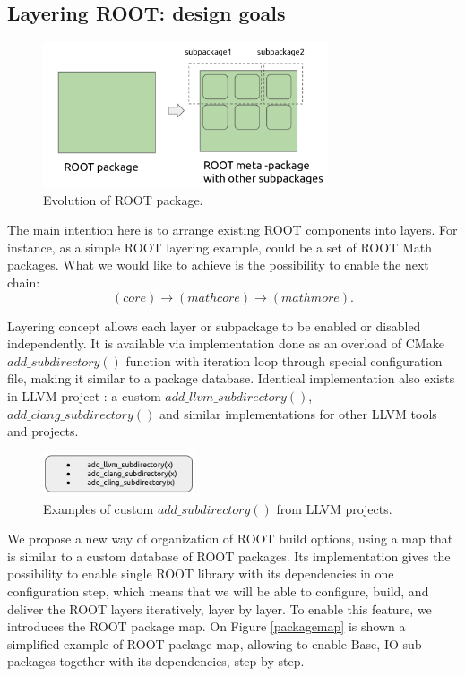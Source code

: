 \documentclass[12pt]{iopart}
\begin{document}
\subsection{Layering ROOT: design goals}

\begin{figure}[!h]
\centering
\includegraphics[width=0.75\textwidth]{root-pm-subpackage.png}
\caption{Evolution of ROOT package.}
\label{subpackage}
\end{figure}

The main intention here is to arrange existing ROOT components into layers. For instance, as a simple ROOT layering example, could be a set of ROOT Math packages. What we would like to achieve is the possibility to enable the next chain:
\begin{equation}
  (core) \rightarrow (mathcore)  \rightarrow (mathmore).  
\end{equation}

Layering concept allows each layer or subpackage to be enabled or disabled independently. It is available via implementation done as an overload of CMake $add\_subdirectory()$ function with iteration loop through special configuration file, making it similar to a package database. Identical implementation also exists in LLVM project \cite{llvm}: a custom $add\_llvm\_subdirectory()$, $add\_clang\_subdirectory()$ and similar implementations for other LLVM tools and projects.

\begin{figure}[!h]
\centering
\includegraphics[width=0.4\textwidth]{addsubdir.png}
\caption{Examples of custom $add\_subdirectory()$ from LLVM projects.}
\label{example}
\end{figure}

We propose a new way of organization of ROOT build options, using a map that is similar to a custom database of ROOT packages. Its implementation gives the possibility to enable single ROOT library with its dependencies in one configuration step, which means that we will be able to configure, build, and deliver the ROOT layers iteratively, layer by layer. To enable this feature, we introduces the ROOT package map. On Figure \ref{packagemap} is shown a simplified example of ROOT package map, allowing to enable Base, IO sub-packages together with its dependencies, step by step.
\end{document}
